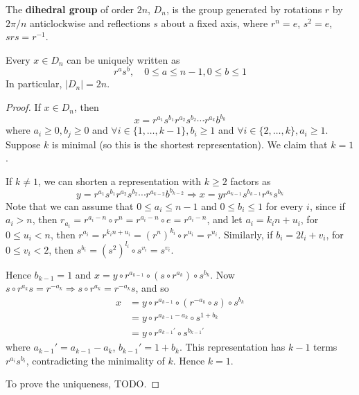 \begin{definition}
	The \textbf{dihedral group} of order $2n$, $D_n$, is the group generated by rotations $r$ by $2 \pi / n$ anticlockwise and reflections $s$ about a fixed axis, where $r^n = e$, $s^2 = e$, $s r s = r^{-1}$.
\end{definition}

\begin{proposition}
	Every $x \in D_n$ can be uniquely written as
	\[
		r^a s^b, \quad 0 \le a \le n - 1, 0 \le b \le 1
	\]
	In particular, $|D_n| = 2n$.
\end{proposition}

\begin{proof}
	If $x \in D_n$, then
	\[
		x = r^{a_1} s^{b_1} r^{a_2} s^{b_2} \cdots r^{a_k} b^{b_k}
	\]
	where $a_i \ge 0, b_j \ge 0$ and $\forall i \in \{ 1, \dots, k - 1\}, b_i \ge 1$ and $\forall i \in \{ 2, \dots, k \}, a_i \ge 1$. Suppose $k$ is minimal (so this is the shortest representation). We claim that $k = 1$.

	If $k \ne 1$, we can shorten a representation with $k \ge 2$ factors as
	\[
		y = r^{a_1} s^{b_1} r^{a_2} s^{b_2} \cdots r^{a_{k - 2}} b^{b_{k - 2}} \Longrightarrow x = y r^{a_{k - 1}} s^{b_{k - 1}} r^{a_k} s^{b_k}
	\]
	Note that we can assume that $0 \le a_i \le n - 1$ and $0 \le b_i \le 1$ for every $i$, since if $a_i > n$, then $r_{a_i} = r^{a_i - n} \circ r^n = r^{a_i - n} \circ e = r^{a_i - n}$, and let $a_i = k_i n + u_i$, for $0 \le u_i < n$, then $r^{a_i} = r^{k_i n + u_i} = {(r^n)}^{k_i} \circ r^{u_i} = r^{u_i}$. Similarly, if $b_i = 2 l_i + v_i$, for $0 \le v_i < 2$, then $s^{b_i} = {(s^2)}^{l_i} \circ s^{v_i} = s^{v_i}$.

	Hence $b_{k - 1} = 1$ and $x = y \circ r^{a_{k - 1}} \circ (s \circ r^{a_k}) \circ s^{b_k}$. Now $s \circ r^{a_k} s = r^{-a_k} \Longrightarrow s \circ r^{a_k} = r^{-a_k} s$, and so
	\[
		\begin{aligned}
			x
				& = y \circ r^{a_{k - 1}} \circ (r^{-a_k} \circ s) \circ s^{b_k} \\
				& = y \circ r^{a_{k - 1} - a_k} \circ s^{1 + b_k} \\
				& = y \circ r^{a_{k - 1}'} \circ s^{b_{k - 1}'}
		\end{aligned}
	\]
	where $a_{k - 1}' = a_{k - 1} - a_k$, $b_{k - 1}' = 1 + b_k$. This representation has $k - 1$ terms $r^{a_i} s^{b_i}$, contradicting the minimality of $k$. Hence $k = 1$.

	To prove the uniqueness, TODO.
\end{proof}

